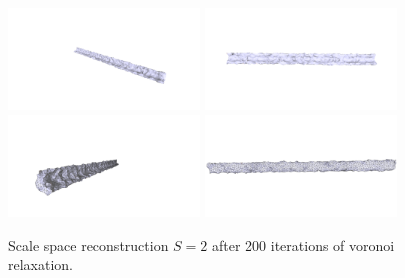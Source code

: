 \documentclass[12pt]{drexelthesis}
\begin{document}
\begin{figure}[!ht]
	\centering
		\includegraphics[trim={5.5in 2in 1.5in 3in},clip,width=2in]{simulated-lab-scan/2cmnoise/optimized/scalespace2Lloyd30s200it00.png}
		\includegraphics[trim={5in 2in 2in 3in},clip,width=2in]{simulated-lab-scan/2cmnoise/optimized/scalespace2Lloyd30s200it01.png}
		\includegraphics[trim={2.5in 2in 3in 3in},clip,width=2in]{simulated-lab-scan/2cmnoise/optimized/scalespace2Lloyd30s200it02.png}
		\includegraphics[trim={2in 4in 3in 3.5in},clip,width=2in]{simulated-lab-scan/2cmnoise/optimized/scalespace2Lloyd30s200it03.png}
		\caption[Scale space reconstruction $S = 2$ after 200 iterations of voronoi relaxation]{\centering Scale space reconstruction $S = 2$ after 200 iterations of voronoi relaxation.}
	\label{2cmnoise:scalespace2lloyd}
\end{figure}
\end{document}
